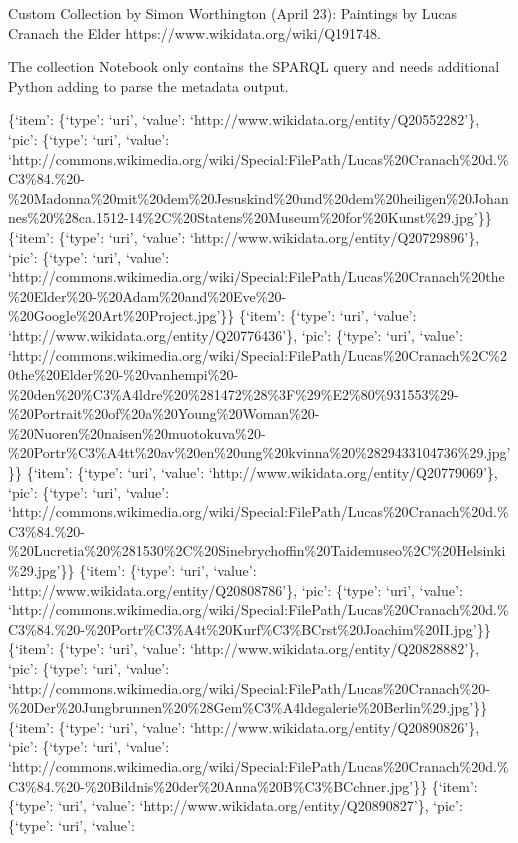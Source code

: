 \documentclass[
  letterpaper,
]{book}
\begin{document}
Custom Collection by Simon Worthington (April 23): Paintings by Lucas
Cranach the Elder https://www.wikidata.org/wiki/Q191748.

The collection Notebook only contains the SPARQL query and needs
additional Python adding to parse the metadata output.

\{`item': \{`type': `uri', `value':
`http://www.wikidata.org/entity/Q20552282'\}, `pic': \{`type': `uri',
`value':
`http://commons.wikimedia.org/wiki/Special:FilePath/Lucas\%20Cranach\%20d.\%C3\%84.\%20-\%20Madonna\%20mit\%20dem\%20Jesuskind\%20und\%20dem\%20heiligen\%20Johannes\%20\%28ca.1512-14\%2C\%20Statens\%20Museum\%20for\%20Kunst\%29.jpg'\}\}
\{`item': \{`type': `uri', `value':
`http://www.wikidata.org/entity/Q20729896'\}, `pic': \{`type': `uri',
`value':
`http://commons.wikimedia.org/wiki/Special:FilePath/Lucas\%20Cranach\%20the\%20Elder\%20-\%20Adam\%20and\%20Eve\%20-\%20Google\%20Art\%20Project.jpg'\}\}
\{`item': \{`type': `uri', `value':
`http://www.wikidata.org/entity/Q20776436'\}, `pic': \{`type': `uri',
`value':
`http://commons.wikimedia.org/wiki/Special:FilePath/Lucas\%20Cranach\%2C\%20the\%20Elder\%20-\%20vanhempi\%20-\%20den\%20\%C3\%A4ldre\%20\%281472\%28\%3F\%29\%E2\%80\%931553\%29-\%20Portrait\%20of\%20a\%20Young\%20Woman\%20-\%20Nuoren\%20naisen\%20muotokuva\%20-\%20Portr\%C3\%A4tt\%20av\%20en\%20ung\%20kvinna\%20\%2829433104736\%29.jpg'\}\}
\{`item': \{`type': `uri', `value':
`http://www.wikidata.org/entity/Q20779069'\}, `pic': \{`type': `uri',
`value':
`http://commons.wikimedia.org/wiki/Special:FilePath/Lucas\%20Cranach\%20d.\%C3\%84.\%20-\%20Lucretia\%20\%281530\%2C\%20Sinebrychoffin\%20Taidemuseo\%2C\%20Helsinki\%29.jpg'\}\}
\{`item': \{`type': `uri', `value':
`http://www.wikidata.org/entity/Q20808786'\}, `pic': \{`type': `uri',
`value':
`http://commons.wikimedia.org/wiki/Special:FilePath/Lucas\%20Cranach\%20d.\%C3\%84.\%20-\%20Portr\%C3\%A4t\%20Kurf\%C3\%BCrst\%20Joachim\%20II.jpg'\}\}
\{`item': \{`type': `uri', `value':
`http://www.wikidata.org/entity/Q20828882'\}, `pic': \{`type': `uri',
`value':
`http://commons.wikimedia.org/wiki/Special:FilePath/Lucas\%20Cranach\%20-\%20Der\%20Jungbrunnen\%20\%28Gem\%C3\%A4ldegalerie\%20Berlin\%29.jpg'\}\}
\{`item': \{`type': `uri', `value':
`http://www.wikidata.org/entity/Q20890826'\}, `pic': \{`type': `uri',
`value':
`http://commons.wikimedia.org/wiki/Special:FilePath/Lucas\%20Cranach\%20d.\%C3\%84.\%20-\%20Bildnis\%20der\%20Anna\%20B\%C3\%BCchner.jpg'\}\}
\{`item': \{`type': `uri', `value':
`http://www.wikidata.org/entity/Q20890827'\}, `pic': \{`type': `uri',
`value':
\end{document}
